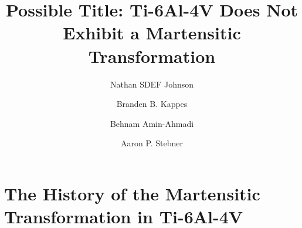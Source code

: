 \documentclass[notitlepage,nofootinbib]{revtex4-1}
\begin{document}
\title{Possible Title: Ti-6Al-4V Does Not Exhibit a Martensitic Transformation}
\author{Nathan SDEF Johnson}

\author{Branden B. Kappes}

\author{Behnam Amin-Ahmadi}

\author{Aaron P. Stebner}

\maketitle

\section{The History of the Martensitic Transformation in Ti-6Al-4V}




\end{document}
